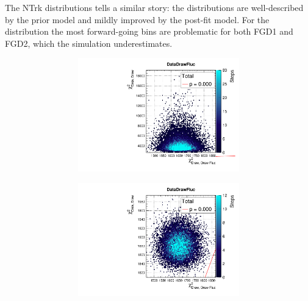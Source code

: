 The NTrk distributions tells a similar story: the \pmu distributions are well-described by the prior model and mildly improved by the post-fit model. For the \cosmu distribution the most forward-going bins are problematic for both FGD1 and FGD2, which the simulation underestimates.
\begin{figure}[h]
	\begin{subfigure}[t]{\textwidth}
	\begin{subfigure}[t]{0.24\textwidth}
		\includegraphics[width=\textwidth, trim={0mm 0mm 0mm 8mm}, clip,page=100]{figures/mach3/data/priorpred/2017b_NewDet_3Xsec_4Det_5Flux_NewXSecTune_Data_merge_PriorPred_procs}
	\end{subfigure}
	\begin{subfigure}[t]{0.24\textwidth}
		\includegraphics[width=\textwidth, trim={0mm 0mm 0mm 8mm}, clip,page=100]{figures/mach3/data/postpred/2017b_NewData_NewDet_UpdXsecStep_2Xsec_4Det_5Flux_0_PostPred_procs}

\end{subfigure}
\end{subfigure}
\end{figure}
